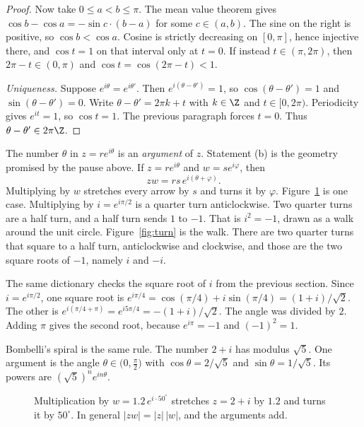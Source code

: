 \begin{proof}
Now take $0\le a<b\le\pi$. The mean value theorem gives $\cos b-\cos a=-\sin c\cdot(b-a)$ for some $c\in(a,b)$. The sine on the right is positive, so $\cos b<\cos a$. Cosine is strictly decreasing on $[0,\pi]$, hence injective there, and $\cos t=1$ on that interval only at $t=0$. If instead $t\in(\pi,2\pi)$, then $2\pi-t\in(0,\pi)$ and $\cos t=\cos(2\pi-t)<1$.

\emph{Uniqueness.} Suppose $e^{i\theta}=e^{i\theta'}$. Then $e^{i(\theta-\theta')}=1$, so $\cos(\theta-\theta')=1$ and $\sin(\theta-\theta')=0$. Write $\theta-\theta'=2\pi k+t$ with $k\in\Z$ and $t\in[0,2\pi)$. Periodicity gives $e^{it}=1$, so $\cos t=1$. The previous paragraph forces $t=0$. Thus $\theta-\theta'\in2\pi\Z$.
\end{proof}


The number $\theta$ in $z=re^{i\theta}$ is an \emph{argument} of $z$. Statement (b) is the geometry promised by the pause above. If $z=re^{i\theta}$ and $w=se^{i\varphi}$, then
\[
zw=rs\,e^{i(\theta+\varphi)}.
\]
Multiplying by $w$ stretches every arrow by $s$ and turns it by $\varphi$. Figure~\ref{fig:multiply} is one case. Multiplying by $i=e^{i\pi/2}$ is a quarter turn anticlockwise. Two quarter turns are a half turn, and a half turn sends $1$ to $-1$. That is $i^2=-1$, drawn as a walk around the unit circle. Figure~\ref{fig:turn} is the walk. There are two quarter turns that square to a half turn, anticlockwise and clockwise, and those are the two square roots of $-1$, namely $i$ and $-i$.

The same dictionary checks the square root of $i$ from the previous section. Since $i=e^{i\pi/2}$, one square root is $e^{i\pi/4}=\cos(\pi/4)+i\sin(\pi/4)=(1+i)/\sqrt2$. The other is $e^{i(\pi/4+\pi)}=e^{i5\pi/4}=-(1+i)/\sqrt2$. The angle was divided by $2$. Adding $\pi$ gives the second root, because $e^{i\pi}=-1$ and $(-1)^2=1$.

Bombelli's spiral is the same rule. The number $2+i$ has modulus $\sqrt5$. One argument is the angle $\theta\in\bigl(0,\frac\pi2\bigr)$ with $\cos\theta=2/\sqrt5$ and $\sin\theta=1/\sqrt5$. Its powers are $(\sqrt5)^n e^{in\theta}$.

\begin{figure}[ht]
\centering
{}
\caption{Multiplication by $w=1.2\,e^{i\cdot50^\circ}$ stretches $z=2+i$ by $1.2$ and turns it by $50^\circ$. In general $|zw|=|z|\,|w|$, and the arguments add.}
\label{fig:multiply}
\end{figure}


